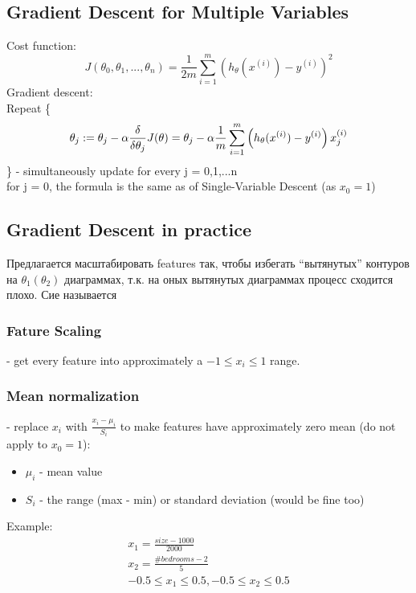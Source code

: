 \documentclass{scrartcl}
\begin{document}
\subsection {Gradient Descent for Multiple Variables}
Cost function:
\[
J(\theta_0, \theta_1, ..., \theta_n) = \frac{1}{2m} \sum\limits_{i=1}^m\left(h_\theta(x^{(i)}) - y^{(i)} \right)^2
\]
Gradient descent: \\
Repeat \{
 \[ \theta_j := \theta_j - \alpha \frac
 {\delta}{\delta\theta_j}J(\theta) \\
= \theta_j - \alpha \frac{1}{m}  \sum\limits_{i=1}^m\left(h_\theta(x^{(i)}) - y^{(i)} \right)x_j^{(i)} \]
\} - simultaneously update for every j = 0,1,...n \\
for j = 0, the formula is the same as of Single-Variable Descent (as
$x_0 = 1$)
\label {4-3} 
\subsection {Gradient Descent in practice}
Предлагается масштабировать features так, чтобы избегать ``вытянутых''
контуров на $\theta_1(\theta_2)$ диаграммах, т.к. на оных вытянутых
диаграммах процесс сходится плохо. Сие называется 

\subsubsection{ Fature Scaling} 
- get every feature into approximately a $-1 \leq x_i \leq 1$ range.
\subsubsection {Mean normalization}
- replace $x_i$ with $\frac{x_i - \mu_i}{S_i}$ to make features have approximately
zero mean (do not apply to $x_0 = 1$):
\begin{itemize}
\item{$\mu_i$} - mean value
\item{$S_i$} - the range (max - min) or standard deviation (would be fine too)
\end{itemize}
Example:
\begin{equation*}
\begin{split}
x_1 = \frac{size-1000}{2000} \\
x_2 = \frac{\#bedrooms-2}{5} \\
-0.5 \leq x_1 \leq 0.5, -0.5 \leq x_2 \leq 0.5
\end{split}
\end{equation*}
\end{document}
